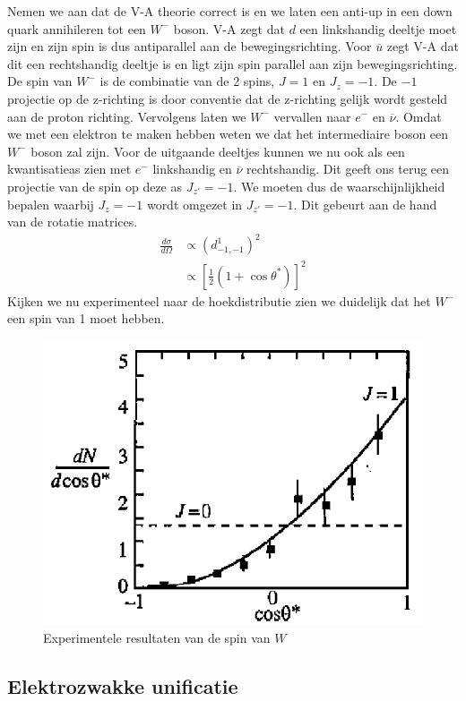 \documentclass[../main.tex]{subfiles}
\begin{document}
Nemen we aan dat de V-A theorie correct is en we laten een anti-up in een down quark annihileren tot een $W^-$ boson. V-A zegt dat $d$ een linkshandig deeltje moet zijn en zijn spin is dus antiparallel aan de bewegingsrichting. Voor $\overline u$ zegt V-A dat dit een rechtshandig deeltje is en ligt zijn spin parallel aan zijn bewegingsrichting. De spin van $W^-$ is de combinatie van de 2 spins, $J=1$ en $J_z=-1$. De $-1$ projectie op de z-richting is door conventie dat de z-richting gelijk wordt gesteld aan de proton richting. Vervolgens laten we $W^-$ vervallen naar $e^-$ en $\overline \nu$. Omdat we met een elektron te maken hebben weten we dat het intermediaire boson een $W^-$ boson zal zijn. Voor de uitgaande deeltjes kunnen we nu ook als een kwantisatieas zien met $e^-$ linkshandig en $\overline \nu$ rechtshandig. Dit geeft ons terug een projectie van de spin op deze as $J_{z'}=-1$. We moeten dus de waarschijnlijkheid bepalen waarbij $J_z=-1$ wordt omgezet in $J_{z'}=-1$. Dit gebeurt aan de hand van de rotatie matrices.
\begin{equation}
    \begin{aligned}
        \label{eq:kans_proj_omz}
        \frac{d\sigma}{d\Omega} &\propto (d_{-1,-1}^1)^2\\
                                &\propto \left[ \frac{1}{2} (1+\cos\theta^*)\right]^2
    \end{aligned}
\end{equation}
Kijken we nu experimenteel naar de hoekdistributie zien we duidelijk dat het $W^-$ een spin van 1 moet hebben.

\begin{figure}[h]
    \centering
    \includegraphics[width=0.4\linewidth]{elektroweak_precision_tests/spin_van_w_resultaten.png}
    \caption{Experimentele resultaten van de spin van $W$}%
    \label{fig:elektroweak_precision_tests/spin_van_w_resultaten}
\end{figure}

\subsection{Elektrozwakke unificatie}%
\label{sub:elektrozwakke_unificatie}
\end{document}
